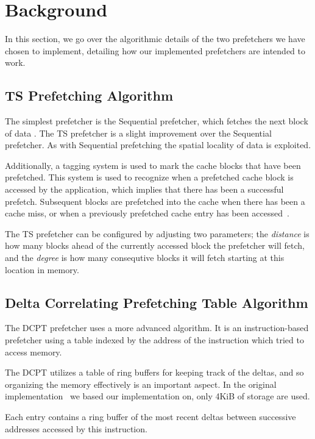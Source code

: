 \section{Background}

In this section, we go over the algorithmic details of the two prefetchers we
have chosen to implement, detailing how our implemented prefetchers are intended
to work.

\subsection{TS Prefetching Algorithm}

The simplest prefetcher is the Sequential prefetcher, which fetches the next
block of data \cite{seq}. The TS prefetcher is a slight
improvement over the Sequential prefetcher. As with Sequential prefetching the
spatial locality of data is exploited.

Additionally, a tagging system is used to mark the cache blocks that have been
prefetched. This system is used to recognize when a prefetched cache block is
accessed by the application, which implies that there has been a successful
prefetch. Subsequent blocks are prefetched into the cache when there has been a
cache miss, or when a previously prefetched cache entry has been
accessed~\cite{grannaes}.

The TS prefetcher can be configured by adjusting two parameters;
the \emph{distance} is how many blocks ahead of the currently accessed block the
prefetcher will fetch, and the \emph{degree} is how many consequtive blocks it
will fetch starting at this location in memory.

\subsection{Delta Correlating Prefetching Table Algorithm}

The DCPT prefetcher uses a more advanced algorithm. It is an instruction-based
prefetcher using a table indexed by the address of the instruction which tried
to access memory.

The DCPT utilizes a table of ring buffers for keeping track of the deltas, and
so organizing the memory effectively is an important aspect. In the original
implementation~\cite{dcpt} we based our implementation on, only 4KiB of storage
are used.

Each entry contains a ring buffer of the most recent deltas between successive
addresses accessed by this instruction.

